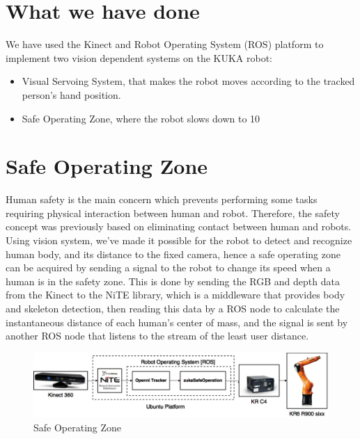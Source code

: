 \section{What we have done}
We have used the Kinect and Robot Operating System (ROS) platform to implement two vision dependent systems on the KUKA robot:
\begin{itemize}
    \item Visual Servoing System, that makes the robot moves according to the tracked person’s hand position.
    \item Safe Operating Zone, where the robot slows down to 10%
\end{itemize}

\section{Safe Operating Zone}
Human safety is the main concern which prevents performing some tasks requiring physical interaction between human and robot. Therefore, the safety concept was previously based on eliminating contact between human and robots.
Using vision system, we’ve made it possible for the robot to detect and recognize human body, and its distance to the fixed camera, hence a safe operating zone can be acquired by sending a signal to the robot to change its speed when a human is in the safety zone.
This is done by sending the RGB and depth data from the Kinect to the NiTE library, which is a middleware that provides body and skeleton detection, then reading this data by a ROS node to calculate the instantaneous distance of each human’s center of mass, and the signal is sent by another ROS node that listens to the stream of the least user distance.
\begin{figure}
    \centering
    \includegraphics[width=\linewidth]{figures/kinectSaftyZone}
    \caption{Safe Operating Zone}
    \label{fig:kinectsaftyzone}
\end{figure}

